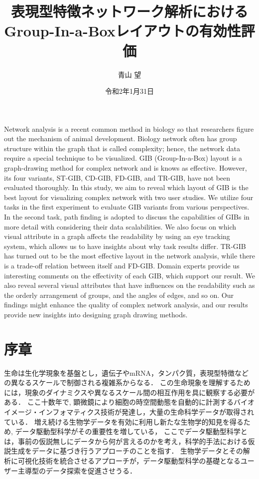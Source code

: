 \documentclass{kuee}
\title{表現型特徴ネットワーク解析におけるGroup-In-a-Boxレイアウトの有効性評価}
\author{青山 望}
\date{令和2年1月31日}
\begin{document}
\maketitle      %
\begin{eabstract}   %
Network analysis is a recent common method in biology so that researchers figure out the mechanism of animal development.
Biology network often has group structure within the graph that is called complexity; hence, the network data require a special technique to be visualized.
GIB (Group-In-a-Box) layout is a graph-drawing method for complex network and is knows as effective.
However, its four variants, ST-GIB, CD-GIB, FD-GIB, and TR-GIB, have not been evaluated thoroughly.
In this study, we aim to reveal which layout of GIB is the best layout for visualizing complex network with two user studies.
We utilize four tasks in the first experiment to evaluate GIB variants from various perspectives.
In the second task, path finding is adopted to discuss the capabilities of GIBs in more detail with considering their data scalabilities.
We also focus on which visual attribute in a graph affects the readability by using an eye tracking system, which allows us to have insights about why task results differ.
TR-GIB has turned out to be the most effective layout in the network analysis, while there is a trade-off relation between itself and FD-GIB.
Domain experts provide us interesting comments on the effectivity of each GIB, which support our result.
We also reveal several visual attributes that have influences on the readability such as the orderly arrangement of groups, and the angles of edges, and so on.
Our findings might enhance the quality of complex network analysis, and our results provide new insights into designing graph drawing methods.
\end{eabstract}
\tableofcontents    %
{}
\chapter{序章}
\label{chap:intro}

生命は生化学現象を基盤とし，遺伝子やmRNA，タンパク質，表現型特徴などの異なるスケールで制御される複雑系からなる．
この生命現象を理解するためには，現象のダイナミクスや異なるスケール間の相互作用を具に観察する必要がある．
ここ十数年で, 顕微鏡により細胞の時空間動態を自動的に計測するバイオイメージ・インフォマティクス技術が発達し，大量の生命科学データが取得されている．
増え続ける生物学データを有効に利用し新たな生物学的知見を得るため, データ駆動型科学がその重要性を増している，
ここでデータ駆動型科学とは，事前の仮説無しにデータから何が言えるのかを考え，科学的手法における仮説生成をデータに基づき行うアプローチのことを指す．
生物学データとその解析に可視化技術を統合させるアプローチが，データ駆動型科学の基礎となるユーザー主導型のデータ探索を促進させうる．
\end{document}
